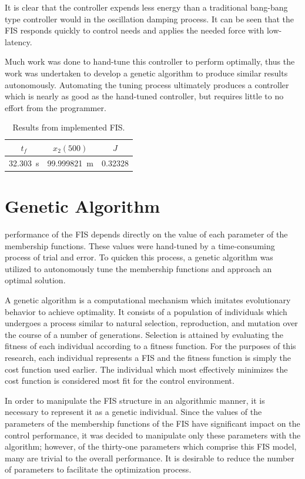 \documentclass[submit]{aiaa-tc}%
\begin{document}
It is clear that the controller expends less energy than a traditional bang-bang type controller would in the oscillation damping process. It can be seen that the FIS responds quickly to control needs and applies the needed force with low-latency. 

Much work was done to hand-tune this controller to perform optimally, thus the work was undertaken to develop a genetic algorithm to produce similar results autonomously. Automating the tuning process ultimately produces a controller which is nearly as good as the hand-tuned controller, but requires little to no effort from the programmer.

\begin{table}
\centering
\caption{Results from implemented FIS.}
\label{tab:finalres}
\begin{tabular}{|c|c|c|}
\hline
$t_f$ & $x_2(500)$ & $J$ \\ \hline
\SI{32.303}{\second} & \SI{99.999821}{\metre} & 0.32328 \\ \hline
\end{tabular}
\end{table}

\section{Genetic Algorithm}\label{s:ga}
 performance of the FIS depends directly on the value of each parameter of the membership functions. These values were hand-tuned by a time-consuming process of trial and error. To quicken this process, a genetic algorithm was utilized to autonomously tune the membership functions and approach an optimal solution. 

      A genetic algorithm is a computational mechanism which imitates evolutionary behavior to achieve optimality. It consists of a population of individuals which undergoes a process similar to natural selection, reproduction, and mutation over the course of a number of generations\cite{cordon:01bk}. Selection is attained by evaluating the fitness of each individual according to a fitness function. For the purposes of this research, each individual represents a FIS and the fitness function is simply the cost function used earlier. The individual which most effectively minimizes the cost function is considered most fit for the control environment.
      
      In order to manipulate the FIS structure in an algorithmic manner, it is necessary to represent it as a genetic individual. Since the values of the parameters of the membership functions of the FIS have significant impact on the control performance, it was decided to manipulate only these parameters with the algorithm; however, of the thirty-one parameters which comprise this FIS model, many are trivial to the overall performance. It is desirable to reduce the number of parameters to facilitate the optimization process.
\end{document}
